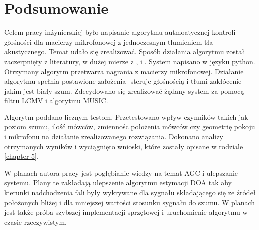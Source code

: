 \chapter{Podsumowanie}
\label{chapter-6}

Celem pracy inżynierskiej było napisanie algorytmu autmoatycznej kontroli głośności dla macierzy mikrofonowej z jednoczesnym tlumieniem tła akustycznego. Temat udało się zrealizować. Sposób działania algorytmu został zaczerpnięty z literatury, w dużej mierze z \cite{Braun2014}, \cite{Thiergart2013} i  \cite{Schmidt1986}. System napisano w języku python. Otrzymany algorytm przetwarza nagrania z macierzy mikrofonowej. Działanie algorytmu spełnia postawione założenia -steruje głośnością i tłumi zakłócenie jakim jest biały szum. Zdecydowano się zrealizować żądany system za pomocą filtru LCMV i algorytmu MUSIC.

Algorytm poddano licznym testom. Przetestowano wpływ czynników takich jak poziom szumu, ilość mówców, zmiennośc położenia mówców czy geometrię pokoju i mikrofonu na działanie zrealizowanego rozwiązania. Dokonano analizy otrzymanych wyników i wyciągnięto wnioski, które zostały opisane w rodziale \ref{chapter-5}. 

W planach autora pracy jest pogłębianie wiedzy na temat AGC i ulepszanie systemu. Plany te zakładają ulepszenie algorytmu estymacji DOA tak aby kierunki nadchodzenia fali były wykrywane dla sygnału składającego się ze źródeł położonych bliżej i dla mniejszej wartości stosunku sygnału do szumu. W planach jest także próba szybszej implementacji sprzętowej i uruchomienie algorytmu w czasie rzeczywistym.